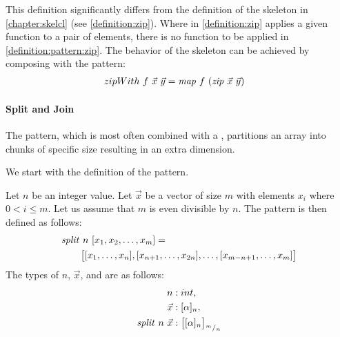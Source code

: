 \noindent
This definition significantly differs from the definition of the \zip skeleton in \autoref{chapter:skelcl} (see \autoref{definition:zip}).
Where in \autoref{definition:zip} \zip applies a given function to a pair of elements, there is no function to be applied in \autoref{definition:pattern:zip}.
The behavior of the \zip skeleton can be achieved by composing \zip with the \map pattern:
\begin{align*}
  zipWith\ f\ \vec{x}\ \vec{y} &= \text{\textit{map}}\ f\ (\text{\textit{zip}}\ \vec{x}\ \vec{y})
\end{align*}


\paragraph{Split and Join}
The \splitN pattern, which is most often combined with a \join, partitions an array into chunks of specific size resulting in an extra dimension.

We start with the definition of the \splitN pattern.
\begin{definition}
  \label{definition:pattern:split}
  Let $n$ be an integer value.
  Let $\vec{x}$ be a vector of size $m$ with elements $x_i$ where $0 < i \leq m$.
  Let us assume that $m$ is even divisible by $n$.
  The \splitN pattern is then defined as follows:
  \begin{align*}
    &\text{\textit{split}}\ n\ [x_1, x_2, \dots, x_m] =\\
    &\qquad\big[[x_1, \ldots, x_n], [x_{n+1}, \ldots, x_{2n}], \ldots, [x_{m-n+1}, \ldots, x_m]\big]
  \end{align*}
  The types of $n$, $\vec{x}$, and \splitN are as follows:
  \begin{align*}
    n &: int,\\
    \vec{x} &: [\alpha]_n,\\
    \text{\textit{split}}\ n\ \vec{x} &: \big[[\alpha]_n\big]_{{}^m/_n}
  \end{align*}
\end{definition}

\bigskip

